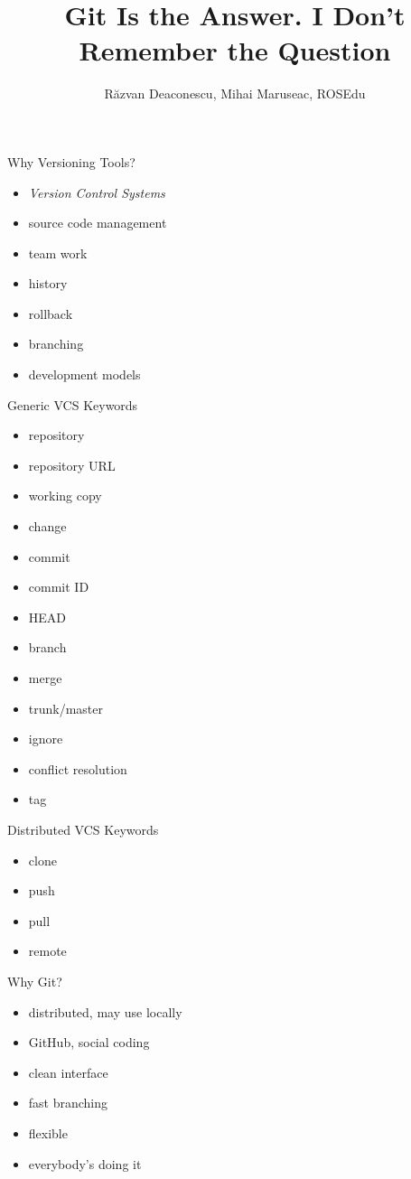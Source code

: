 \documentclass{beamer}
\title{Git Is the Answer. I Don't Remember the Question}
\author{Răzvan Deaconescu, Mihai Maruseac, ROSEdu}
\begin{document}
\maketitle

\begin{frame}{Why Versioning Tools?}
  \begin{itemize}
    \item \textit{Version Control Systems}
    \item source code management
    \item team work
    \item history
    \item rollback
    \item branching
    \item development models
  \end{itemize}
\end{frame}

\begin{frame}{Generic VCS Keywords}
  \begin{itemize}
    \item repository
    \item repository URL
    \item working copy
    \item change
    \item commit
    \item commit ID
    \item HEAD
    \item branch
    \item merge
    \item trunk/master
    \item ignore
    \item conflict resolution
    \item tag
  \end{itemize}
\end{frame}

\begin{frame}{Distributed VCS Keywords}
  \begin{itemize}
    \item clone
    \item push
    \item pull
    \item remote
  \end{itemize}
\end{frame}

\begin{frame}{Why Git?}
  \begin{itemize}
    \item distributed, may use locally
    \item GitHub, social coding
    \item clean interface
    \item fast branching
    \item flexible
    \item everybody's doing it
  \end{itemize}
\end{frame}
\end{document}
